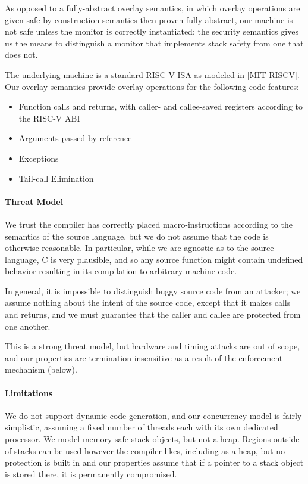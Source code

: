 \documentclass[10pt,conference]{ieeetran}%
\theoremstyle{definition}
\begin{document}
As opposed to a fully-abstract overlay semantics, in which overlay operations
are given safe-by-construction semantics then proven fully abstract,
our machine is not safe unless the monitor is correctly instantiated;
the security semantics gives us the means to distinguish a monitor that implements
stack safety from one that does not.

The underlying machine is a standard RISC-V ISA as modeled in [MIT-RISCV].
Our overlay semantics provide overlay operations for the following code features:
\begin{itemize}
\item Function calls and returns, with caller- and callee-saved registers according
  to the RISC-V ABI
\item Arguments passed by reference
\item Exceptions
\item Tail-call Elimination
\end{itemize}

\paragraph*{Threat Model}

We trust the compiler has correctly placed macro-instructions according to
the semantics of the source language, but we do not assume that the code
is otherwise reasonable. In particular, while we are agnostic as to the source
language, C is very plausible, and so any source function might contain undefined
behavior resulting in its compilation to arbitrary machine code.

In general, it is impossible to distinguish buggy source code from an attacker;
we assume nothing about the intent of the source code, except that it makes calls
and returns, and we must guarantee that the caller and callee are protected from one
another.

This is a strong threat model, but hardware and timing attacks are out of scope,
and our properties are termination insensitive as a result of the enforcement mechanism
(below).

\paragraph*{Limitations}

We do not support dynamic code generation, and our concurrency model is fairly
simplistic, assuming a fixed number of threads each with its own dedicated processor.
We model memory safe stack objects, but not a heap. Regions outside of
stacks can be used however the compiler likes, including as a heap, but no protection is
built in and our properties assume that if a pointer to a stack object is stored there,
it is permanently compromised.
\end{document}
